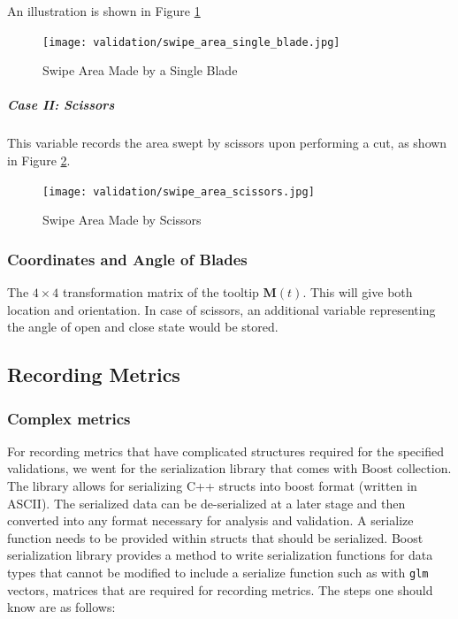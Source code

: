 An illustration is shown in Figure \ref{fig:single_blade_area}

\begin{figure}
  \centering%
  \texttt{[image: validation/swipe\_area\_single\_blade.jpg]}
  \caption{Swipe Area Made by a Single Blade}\label{fig:single_blade_area}
\end{figure}

\subparagraph{Case II: Scissors}

This variable records the area swept by scissors upon performing a cut, as shown in Figure \ref{fig:scissors_area}.

\begin{figure}
  \centering%
  \texttt{[image: validation/swipe\_area\_scissors.jpg]}
  \caption{Swipe Area Made by Scissors}\label{fig:scissors_area}
\end{figure}

\subsubsection{Coordinates and Angle of Blades}\label{para:data_coordinates_of_blades}

The $4\times 4$ transformation matrix of the tooltip $\mathbf{M}(t)$. This will give both location and orientation. In case of scissors, an additional variable representing the angle of open and close state would be stored.


\subsection{Recording Metrics}\label{chp:literature}

\subsubsection{Complex metrics}
For recording metrics that have complicated structures required for the specified validations, we went for the serialization library that comes with Boost collection. The library allows for serializing C++ structs into boost format (written in ASCII). The serialized data can be de-serialized at a later stage and then converted into any format necessary for analysis and validation. A serialize function needs to be provided within structs that should be serialized. Boost serialization library provides a method to write serialization functions for data types that cannot be modified to include a serialize function such as with \texttt{glm} vectors, matrices that are required for recording metrics. The steps one should know are as follows:

